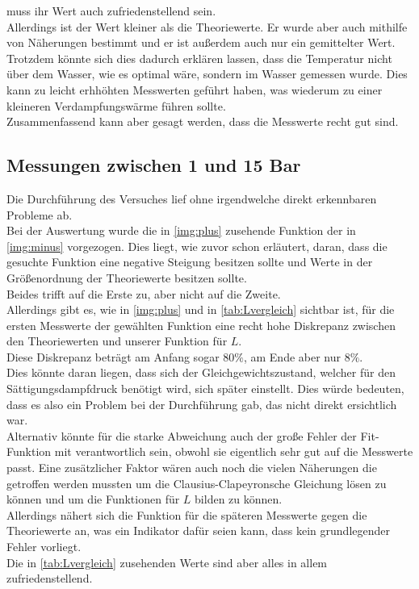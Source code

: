 muss ihr Wert auch zufriedenstellend sein.\\ 
Allerdings ist der Wert kleiner als die Theoriewerte.
Er wurde aber auch mithilfe von Näherungen bestimmt und er ist außerdem auch nur ein gemittelter Wert.
Trotzdem könnte sich dies dadurch erklären lassen, dass die Temperatur nicht über dem Wasser, wie es optimal wäre, sondern im Wasser gemessen wurde.
Dies kann zu leicht erhhöhten Messwerten geführt haben, was wiederum zu einer kleineren Verdampfungswärme führen sollte.\\
Zusammenfassend kann aber gesagt werden, dass die Messwerte recht gut sind.



\subsection{Messungen zwischen 1 und 15 Bar}

Die Durchführung des Versuches lief ohne irgendwelche direkt erkennbaren Probleme ab.\\
Bei der Auswertung wurde die in \ref{img:plus} zusehende Funktion der in \ref{img:minus} vorgezogen.
Dies liegt, wie zuvor schon erläutert, daran, dass die gesuchte Funktion eine negative Steigung besitzen sollte und Werte in der Größenordnung der Theoriewerte besitzen sollte.\\
Beides trifft auf die Erste zu, aber nicht auf die Zweite.\\
Allerdings gibt es, wie in \ref{img:plus} und in \ref{tab:Lvergleich} sichtbar ist, für die ersten Messwerte der gewählten Funktion eine recht hohe Diskrepanz zwischen den Theoriewerten und unserer Funktion für $L$.\\
Diese Diskrepanz beträgt am Anfang sogar $80 \si{\percent}$, am Ende aber nur $ 8\si{\percent}$.\\
Dies könnte daran liegen, dass sich der Gleichgewichtszustand, welcher für den Sättigungsdampfdruck benötigt wird, sich später einstellt.
Dies würde bedeuten, dass es also ein Problem bei der Durchführung gab, das nicht direkt ersichtlich war.\\
Alternativ könnte für die starke Abweichung auch der große Fehler der Fit-Funktion mit verantwortlich sein, obwohl sie eigentlich sehr gut auf 
die Messwerte passt. Eine zusätzlicher Faktor wären auch noch die vielen Näherungen die getroffen werden mussten um die Clausius-Clapeyronsche Gleichung lösen zu können
und um die Funktionen für $L$ bilden zu können.\\
Allerdings nähert sich die Funktion für die späteren Messwerte gegen die Theoriewerte an, was ein Indikator dafür seien kann, dass kein grundlegender Fehler vorliegt.\\
Die in \ref{tab:Lvergleich} zusehenden Werte sind aber alles in allem zufriedenstellend.

